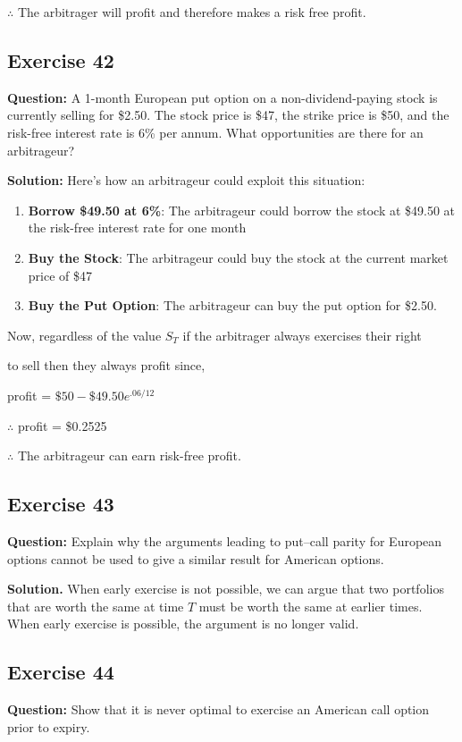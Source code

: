 \documentclass{article}
\begin{document}
$\therefore$ The arbitrager will profit and therefore makes a risk free profit.

\subsection*{Exercise 42}

\textbf{Question:} A 1-month European put option on a non-dividend-paying stock is currently selling for \$2.50. The stock price is \$47, the strike price is \$50, and the risk-free interest rate is 6\% per annum. What opportunities are there for an arbitrageur?
 
\textbf{Solution:}
Here's how an arbitrageur could exploit this situation:

\begin{enumerate}
    \item \textbf{Borrow \$49.50 at 6\%}: The arbitrageur could borrow the stock at \$49.50 at the risk-free interest rate for one month
    \item \textbf{Buy the Stock}: The arbitrageur could buy the stock at the current market price of \$47
    \item \textbf{Buy the Put Option}: The arbitrageur can buy the put option for \$2.50.
\end{enumerate}

Now, regardless of the value $S_T$ if the arbitrager always exercises their right 

to sell then they always profit since,

\vspace{\baselineskip}

profit = $\$50 - \$49.50e^{.06/12}$ 

$\therefore$ profit = \$0.2525

$\therefore$ The arbitrageur can earn risk-free profit.

\subsection*{Exercise 43}
\textbf{Question:} Explain why the arguments leading to put--call parity for European options cannot be used to give a similar result for American options.

\textbf{Solution.} When early exercise is not possible, we can argue that two portfolios that are worth the same at time $T$ must be worth the same at earlier times. When early exercise is possible, the argument is no longer valid.

\subsection*{Exercise 44}
\textbf{Question:} Show that it is never optimal to exercise an American call option prior to expiry.
\end{document}
